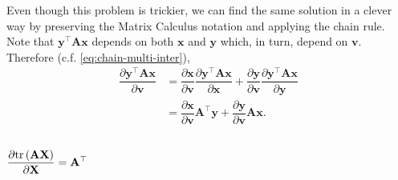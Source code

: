 \documentclass{article}
\newcommand{\trans}{\top}
\begin{document}
Even though this problem is trickier, we can find the same solution in a clever way by preserving the Matrix Calculus notation and applying the chain rule. Note that \(\mathbf{y}^\trans \mathbf{A} \mathbf{x}\) depends on both \(\mathbf{x}\) and \(\mathbf{y}\) which, in turn, depend on \(\mathbf{v}\). Therefore (c.f. \eqref{eq:chain-multi-inter}),
\begin{align}
    \dfrac{\partial \mathbf{y}^\trans \mathbf{A} \mathbf{x}}{\partial \mathbf{v}} & = \dfrac{\partial \mathbf{x}}{\partial \mathbf{v}} \dfrac{\partial \mathbf{y}^\trans \mathbf{A} \mathbf{x}}{\partial \mathbf{x}} + \dfrac{\partial \mathbf{y}}{\partial \mathbf{v}} \dfrac{\partial \mathbf{y}^\trans \mathbf{A} \mathbf{x}}{\partial \mathbf{y}} \\
    & = \dfrac{\partial \mathbf{x}}{\partial \mathbf{v}} \mathbf{A}^{\trans} \mathbf{y} + \dfrac{\partial \mathbf{y}}{\partial \mathbf{v}} \mathbf{A} \mathbf{x}.
\end{align}

\subsection{\(\dfrac{\partial \textnormal{tr}\left(\mathbf{A} \mathbf{X}\right)}{\partial \mathbf{X}} = \mathbf{A}^\trans\)}
\end{document}
